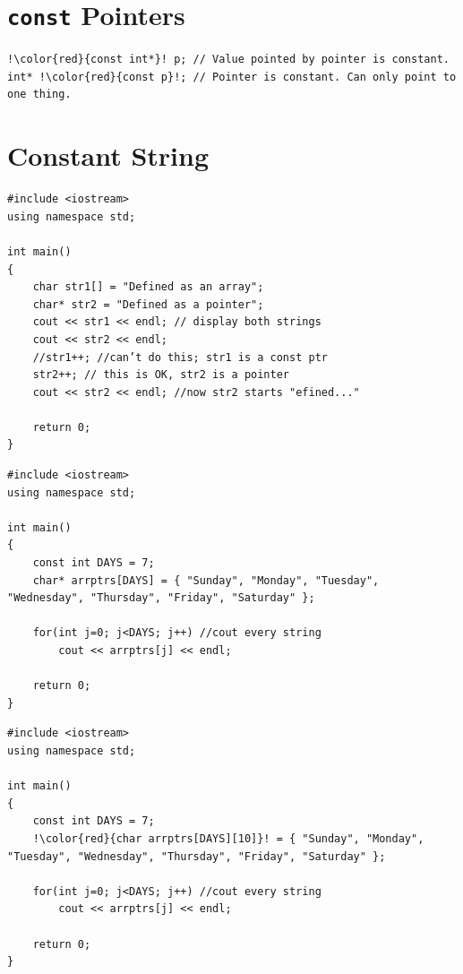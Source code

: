 \documentclass[12pt,a4paper]{article}
\begin{document}
\section{\texttt{const} Pointers}
\begin{lstlisting}[caption={\texttt{const} pointers}, escapechar=!]
!\color{red}{const int*}! p; // Value pointed by pointer is constant.
int* !\color{red}{const p}!; // Pointer is constant. Can only point to one thing.
\end{lstlisting}
\section{Constant String}
\begin{lstlisting}[caption={constant string}]
#include <iostream>
using namespace std;

int main()
{
	char str1[] = "Defined as an array";
	char* str2 = "Defined as a pointer";
	cout << str1 << endl; // display both strings
	cout << str2 << endl;
	//str1++; //can’t do this; str1 is a const ptr
	str2++; // this is OK, str2 is a pointer
	cout << str2 << endl; //now str2 starts "efined..."

	return 0;
}
\end{lstlisting}
\begin{lstlisting}[caption={Array of constant strings, contiguous storage}]
#include <iostream>
using namespace std;

int main()
{
	const int DAYS = 7;
	char* arrptrs[DAYS] = { "Sunday", "Monday", "Tuesday", "Wednesday", "Thursday", "Friday", "Saturday" };

	for(int j=0; j<DAYS; j++) //cout every string
		cout << arrptrs[j] << endl;

	return 0;
}
\end{lstlisting}
\begin{lstlisting}[caption={Constant column length, non-contiguous storage},escapechar=!]
#include <iostream>
using namespace std;

int main()
{
	const int DAYS = 7;
	!\color{red}{char arrptrs[DAYS][10]}! = { "Sunday", "Monday", "Tuesday", "Wednesday", "Thursday", "Friday", "Saturday" };

	for(int j=0; j<DAYS; j++) //cout every string
		cout << arrptrs[j] << endl;

	return 0;
}
\end{lstlisting}
%
%
\end{document}
